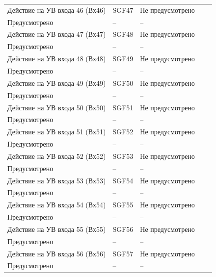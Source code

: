 \begin{longtable}{|>{\centering\arraybackslash}m{5.3cm}|>{\centering\arraybackslash}m{3.3cm}|>{\centering\arraybackslash}m{4.2cm}|>{\centering\arraybackslash}m{1.8cm}|>{\centering\arraybackslash}m{1cm}|}
\hline
\centering Действие на УВ входа 46 (Вх46)  & \centering SGF47 & \centering Не предусмотрено \\ Предусмотрено & \centering -- & \centering \arraybackslash -- \\
\hline
\centering Действие на УВ входа 47 (Вх47)  & \centering SGF48 & \centering Не предусмотрено \\ Предусмотрено & \centering -- & \centering \arraybackslash -- \\
\hline
\centering Действие на УВ входа 48 (Вх48)  & \centering SGF49 & \centering Не предусмотрено \\ Предусмотрено & \centering -- & \centering \arraybackslash -- \\
\hline
\centering Действие на УВ входа 49 (Вх49)  & \centering SGF50 & \centering Не предусмотрено \\ Предусмотрено & \centering -- & \centering \arraybackslash -- \\
\hline
\centering Действие на УВ входа 50 (Вх50)  & \centering SGF51 & \centering Не предусмотрено \\ Предусмотрено & \centering -- & \centering \arraybackslash -- \\
\hline
\centering Действие на УВ входа 51 (Вх51)  & \centering SGF52 & \centering Не предусмотрено \\ Предусмотрено & \centering -- & \centering \arraybackslash -- \\
\hline
\centering Действие на УВ входа 52 (Вх52)  & \centering SGF53 & \centering Не предусмотрено \\ Предусмотрено & \centering -- & \centering \arraybackslash -- \\
\hline
\centering Действие на УВ входа 53 (Вх53)  & \centering SGF54 & \centering Не предусмотрено \\ Предусмотрено & \centering -- & \centering \arraybackslash -- \\
\hline
\centering Действие на УВ входа 54 (Вх54)  & \centering SGF55 & \centering Не предусмотрено \\ Предусмотрено & \centering -- & \centering \arraybackslash -- \\
\hline
\centering Действие на УВ входа 55 (Вх55)  & \centering SGF56 & \centering Не предусмотрено \\ Предусмотрено & \centering -- & \centering \arraybackslash -- \\
\hline
\centering Действие на УВ входа 56 (Вх56)  & \centering SGF57 & \centering Не предусмотрено \\ Предусмотрено & \centering -- & \centering \arraybackslash -- \\

\end{longtable}
